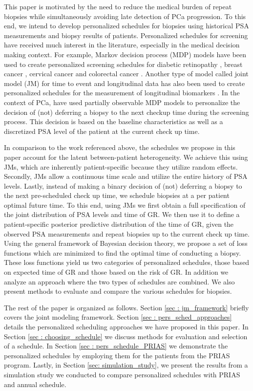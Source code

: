 This paper is motivated by the need to reduce the medical burden of repeat biopsies while simultaneously avoiding late detection of PCa progression.
To this end, we intend to develop personalized schedules for biopsies using historical PSA measurements and biopsy results of patients. Personalized schedules for screening have received much interest in the literature, especially in the medical decision making context. For example, Markov decision process (MDP) models have been used to create personalized screening schedules for diabetic retinopathy \citep{bebu2017OptimalScreening}, breast cancer \citep*{ayer2012or}, cervical cancer \citep*{akhavan2017markov} and colorectal cancer \citep*{erenay2014optimizing}. Another type of model called joint model (JM) for time to event and longitudinal data \citep{tsiatis2004joint,rizopoulos2012joint} has also been used to create personalized schedules for the measurement of longitudinal biomarkers \citep{drizopoulosPersScreening}. In the context of PCa, \citet{zhang2012optimization} have used partially observable MDP models to personalize the decision of (not) deferring a biopsy to the next checkup time during the screening process. This decision is based on the baseline characteristics as well as a discretized PSA level of the patient at the current check up time.

In comparison to the work referenced above, the schedules we propose in this paper account for the latent between-patient heterogeneity. We achieve this using JMs, which are inherently patient-specific because they utilize random effects. Secondly, JMs allow a continuous time scale and utilize the entire history of PSA levels. Lastly, instead of making a binary decision of (not) deferring a biopsy to the next pre-scheduled check up time, we schedule biopsies at a per patient optimal future time. To this end, using JMs we first obtain a full specification of the joint distribution of PSA levels and time of GR. We then use it to define a patient-specific posterior predictive distribution of the time of GR, given the observed PSA measurements and repeat biopsies up to the current check up time. Using the general framework of Bayesian decision theory, we propose a set of loss functions which are minimized to find the optimal time of conducting a biopsy. These loss functions yield us two categories of personalized schedules, those based on expected time of GR and those based on the risk of GR. In addition we analyze an approach where the two types of schedules are combined. We also present methods to evaluate and compare the various schedules for biopsies.

The rest of the paper is organized as follows. Section \ref{sec : jm_framework} briefly covers the joint modeling framework. Section \ref{sec : pers_sched_approaches} details the personalized scheduling approaches we have proposed in this paper. In Section \ref{sec : choosing_schedule} we discuss methods for evaluation and selection of a schedule. In Section \ref{sec : pers_schedule_PRIAS} we demonstrate the personalized schedules by employing them for the patients from the PRIAS program. Lastly, in Section \ref{sec: simulation_study}, we present the results from a simulation study we conducted to compare personalized schedules with PRIAS and annual schedule.